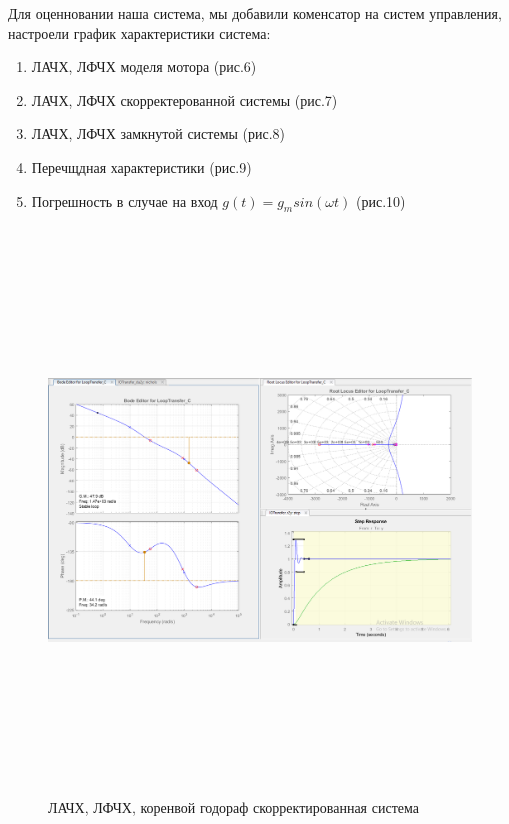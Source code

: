 \documentclass[a4paper,12pt]{article}
\begin{document}
Для оценновании наша система, мы добавили коменсатор на систем управления, настроели график характеристики система:
\begin{enumerate}
    \item ЛАЧХ, ЛФЧХ моделя мотора (рис.6)
    \item ЛАЧХ, ЛФЧХ скорректерованной системы (рис.7)
    \item ЛАЧХ, ЛФЧХ замкнутой системы (рис.8)
    \item Перечщдная характеристики (рис.9)
    \item Погрешность в случае на вход $g(t)=g_m sin(\omega t)$ (рис.10) 
\end{enumerate}


\newpage
\begin{landscape}
\begin{figure}[h]
    \centering
    \includegraphics[height=15cm]{img/final.PNG}
    \caption{ЛАЧХ, ЛФЧХ, коренвой годораф скорректированная система}
    \label{fig:my_label}
\end{figure}
\end{landscape}
\newpage
\end{document}
